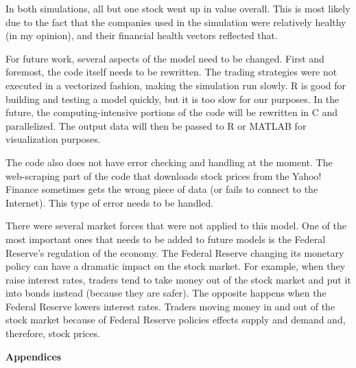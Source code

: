 \documentclass[12pt]{article}
\begin{document}
In both simulations, all but one stock went up in value overall. This is most likely due to the fact that the companies used in the simulation were relatively healthy (in my opinion), and their financial health vectors reflected that. 

For future work, several aspects of the model need to be changed. First and foremost, the code itself needs to be rewritten. The trading strategies were not executed in a vectorized fashion, making the simulation run slowly. R is good for building and testing a model quickly, but it is too slow for our purposes. In the future, the computing-intensive portions of the code will be rewritten in C and parallelized. The output data will then be passed to R or MATLAB for visualization purposes. 

The code also does not have error checking and handling at the moment. The web-scraping part of the code that downloads stock prices from the Yahoo! Finance sometimes gets the wrong piece of data (or fails to connect to the Internet). This type of error needs to be handled. 

There were several market forces that were not applied to this model. One of the most important ones that needs to be added to future models is the Federal Reserve's regulation of the economy. The Federal Reserve changing its monetary policy can have a dramatic impact on the stock market. For example, when they raise interest rates, traders tend to take money out of the stock market and put it into bonds instead (because they are safer). The opposite happens when the Federal Reserve lowers interest rates. Traders moving money in and out of the stock market because of Federal Reserve policies effects supply and demand and, therefore, stock prices. 

\pagebreak

\begin{center}
\begin{large}
\noindent\textbf{Appendices}
\end{large}
\end{center}
\end{document}
